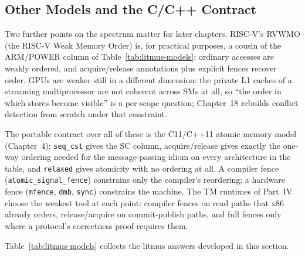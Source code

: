 \subsection{Other Models and the C/C++ Contract}

Two further points on the spectrum matter for later chapters. RISC-V's
RVWMO (the RISC-V Weak Memory Order) is, for practical purposes, a cousin of
the ARM/POWER column of
Table~\ref{tab:litmus-models}: ordinary accesses are weakly ordered, and
acquire/release annotations plus explicit fences recover order. GPUs are
weaker still in a different dimension: the private L1 caches of a
streaming multiprocessor are not coherent across SMs at all, so
``the order in which stores become visible'' is a per-scope question;
Chapter~18 rebuilds conflict detection from scratch under that constraint.

The portable contract over all of these is the C11/C++11 atomic memory
model (Chapter~4): \texttt{seq\_cst} gives the SC column, acquire/release
gives exactly the one-way ordering needed for the message-passing idiom on
every architecture in the table, and \texttt{relaxed} gives atomicity with
no ordering at all. A compiler fence
(\texttt{atomic\_signal\_fence}) constrains only the compiler's
reordering; a hardware fence (\texttt{mfence}, \texttt{dmb},
\texttt{sync}) constrains the machine. The TM runtimes of Part~IV choose
the weakest tool at each point: compiler fences on read paths that x86
already orders, release/acquire on commit-publish paths, and full fences
only where a protocol's correctness proof requires them.

Table~\ref{tab:litmus-models} collects the litmus answers developed in
this section.


